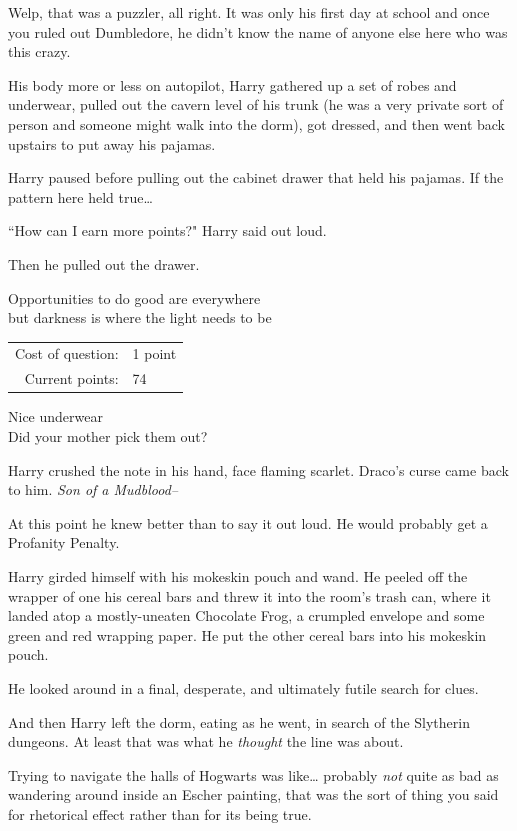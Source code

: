 Welp, that was a puzzler, all right. It was only his first day at school and once you ruled out Dumbledore, he didn't know the name of anyone else here who was this crazy.

His body more or less on autopilot, Harry gathered up a set of robes and underwear, pulled out the cavern level of his trunk (he was a very private sort of person and someone might walk into the dorm), got dressed, and then went back upstairs to put away his pajamas.

Harry paused before pulling out the cabinet drawer that held his pajamas. If the pattern here held true{\ldots}

``How can I earn more points?" Harry said out loud.

Then he pulled out the drawer.

\begin{writtenNote}
Opportunities to do good are everywhere\\
but darkness is where the light needs to be

\begin{tabular}{rl}
Cost of question: & 1 point\\
Current points: & 74
\end{tabular}

Nice underwear\\
Did your mother pick them out?
\end{writtenNote}

Harry crushed the note in his hand, face flaming scarlet. Draco's curse came back to him. \emph{Son of a Mudblood\---}

At this point he knew better than to say it out loud. He would probably get a Profanity Penalty.

Harry girded himself with his mokeskin pouch and wand. He peeled off the wrapper of one his cereal bars and threw it into the room's trash can, where it landed atop a mostly-uneaten Chocolate Frog, a crumpled envelope and some green and red wrapping paper. He put the other cereal bars into his mokeskin pouch.

He looked around in a final, desperate, and ultimately futile search for clues.

And then Harry left the dorm, eating as he went, in search of the Slytherin dungeons. At least that was what he \emph{thought} the line was about.

Trying to navigate the halls of Hogwarts was like{\ldots} probably \emph{not} quite as bad as wandering around inside an Escher painting, that was the sort of thing you said for rhetorical effect rather than for its being true.

